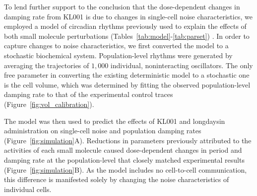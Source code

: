 \documentclass[11pt, letterpaper]{article}
\begin{document}

To lend further support to the conclusion that the dose-dependent changes in damping rate from KL001 is due to changes in single-cell noise characteristics, we employed a model of circadian rhythms previously used to explain the effects of both small molecule perturbations (Tables~\ref{tab:model}-\ref{tab:parset}) \cite{St.John2014}.
In order to capture changes to noise characteristics, we first converted the model to a stochastic biochemical system.
Population-level rhythms were generated by averaging the trajectories of $1,000$ individual, noninteracting oscillators.
The only free parameter in converting the existing deterministic model to a stochastic one is the cell volume, which was determined by fitting the observed population-level damping rate to that of the experimental control traces (Figure~\ref{fig:vol_calibration}).

The model was then used to predict the effects of KL001 and longdaysin administration on single-cell noise and population damping rates (Figure~\ref{fig:simulation}A).
Reductions in parameters previously attributed to the activities of each small molecule caused dose-dependent changes in period and damping rate at the population-level that closely matched experimental results (Figure~\ref{fig:simulation}B).
As the model includes no cell-to-cell communication, this difference is manifested solely by changing the noise characteristics of individual cells.
\end{document}
